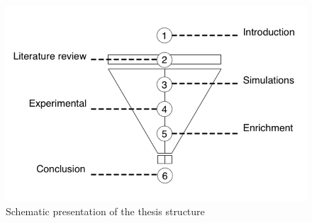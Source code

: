 \begin{figure}
  \includegraphics[width=\linewidth]{figures/funnel.png}
  \caption{Schematic presentation of the thesis structure}
  \label{fig:1}
\end{figure}


\renewcommand{\bibname}{References}

